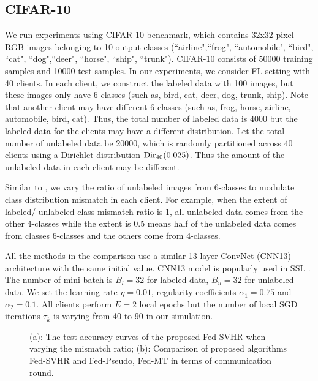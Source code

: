 \documentclass[twoside,journal]{IEEEtran}
\begin{document}
\subsection{CIFAR-10}
We run experiments using CIFAR-10 benchmark, which contains 32x32 pixel RGB images belonging
to 10 output classes (``airline",``frog", ``automobile", ``bird",
``cat", ``dog",``deer",   ``horse", ``ship", ``trunk"). CIFAR-10 consists of 50000 training samples and 10000 test samples. In
our experiments, we
consider FL setting with 40 clients. In each client,
we construct the labeled data with 100 images, but these images only have 6-classes (such as, bird, cat, deer, dog, trunk, ship). Note that another client may have different 6 classes (such as, frog, horse, airline, automobile, bird, cat). Thus, the total number of labeled data is 4000 but the labeled data for the clients may have a different distribution. Let the total number of unlabeled data be 20000, which
 is randomly partitioned
across 40 clients using a Dirichlet distribution $\textmd{Dir}_{40}(0.025)$. Thus the amount of the unlabeled data in each client may be different.



Similar to \cite{guo2020safe}, we vary
the ratio of unlabeled images from 6-classes to modulate class
distribution mismatch in each client. For example, when the extent of labeled/
unlabeled class mismatch ratio is 1, all unlabeled data comes from the other 4-classes while the extent is 0.5 means half of the unlabeled data comes from classes 6-classes
and the others come from 4-classes.

All the methods in the comparison use a similar 13-layer ConvNet (CNN13) architecture with
the same initial value. CNN13 model is popularly used in SSL \cite{laine2016,tarvainen2017,miyato2018virtual}. The number of mini-batch is $B_l=32$ for labeled data, $B_u=32$ for unlabeled data. We set the learning rate $\eta=0.01$,
regularity coefficients $\alpha_1=0.75$ and $\alpha_2=0.1$. All clients perform $E=2$ local epochs but  the number of local SGD iterations $\tau_k$ is varying from 40 to 90 in our simulation.
\begin{figure*}[t]
\centering
{}%
\hspace{-2.1cm}
%
\centering
\caption{(a): The test accuracy curves of the proposed Fed-SVHR  when varying the mismatch ratio; (b): Comparison of proposed algorithms Fed-SVHR and Fed-Pseudo, Fed-MT in terms of communication round. }
\label{fig:mismatch_commu_round_test}
\vspace{-0.1cm}
\end{figure*}
\end{document}
